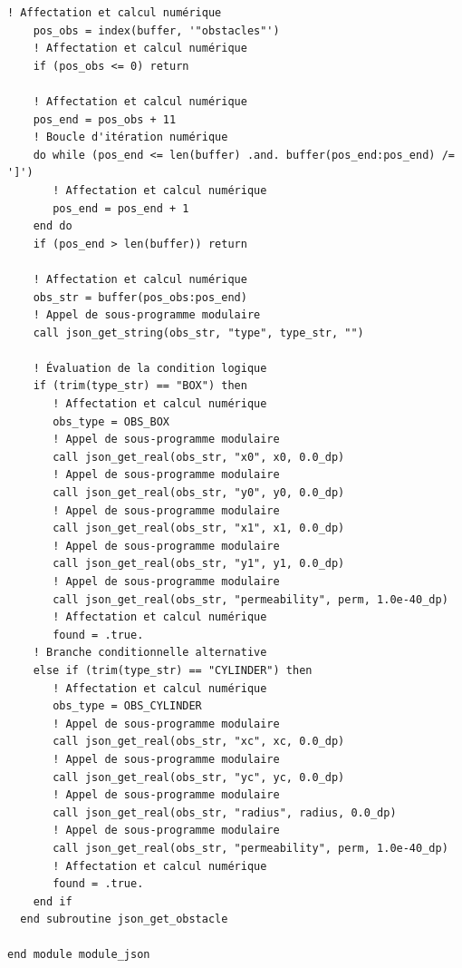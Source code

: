 \documentclass[10pt,a4paper,oneside]{book}
\begin{document}
\begin{lstlisting}[language={[95]Fortran}]
    ! Affectation et calcul numérique
    pos_obs = index(buffer, '"obstacles"')
    ! Affectation et calcul numérique
    if (pos_obs <= 0) return

    ! Affectation et calcul numérique
    pos_end = pos_obs + 11
    ! Boucle d'itération numérique
    do while (pos_end <= len(buffer) .and. buffer(pos_end:pos_end) /= ']')
       ! Affectation et calcul numérique
       pos_end = pos_end + 1
    end do
    if (pos_end > len(buffer)) return

    ! Affectation et calcul numérique
    obs_str = buffer(pos_obs:pos_end)
    ! Appel de sous-programme modulaire
    call json_get_string(obs_str, "type", type_str, "")

    ! Évaluation de la condition logique
    if (trim(type_str) == "BOX") then
       ! Affectation et calcul numérique
       obs_type = OBS_BOX
       ! Appel de sous-programme modulaire
       call json_get_real(obs_str, "x0", x0, 0.0_dp)
       ! Appel de sous-programme modulaire
       call json_get_real(obs_str, "y0", y0, 0.0_dp)
       ! Appel de sous-programme modulaire
       call json_get_real(obs_str, "x1", x1, 0.0_dp)
       ! Appel de sous-programme modulaire
       call json_get_real(obs_str, "y1", y1, 0.0_dp)
       ! Appel de sous-programme modulaire
       call json_get_real(obs_str, "permeability", perm, 1.0e-40_dp)
       ! Affectation et calcul numérique
       found = .true.
    ! Branche conditionnelle alternative
    else if (trim(type_str) == "CYLINDER") then
       ! Affectation et calcul numérique
       obs_type = OBS_CYLINDER
       ! Appel de sous-programme modulaire
       call json_get_real(obs_str, "xc", xc, 0.0_dp)
       ! Appel de sous-programme modulaire
       call json_get_real(obs_str, "yc", yc, 0.0_dp)
       ! Appel de sous-programme modulaire
       call json_get_real(obs_str, "radius", radius, 0.0_dp)
       ! Appel de sous-programme modulaire
       call json_get_real(obs_str, "permeability", perm, 1.0e-40_dp)
       ! Affectation et calcul numérique
       found = .true.
    end if
  end subroutine json_get_obstacle

end module module_json

\end{lstlisting}
\end{document}
